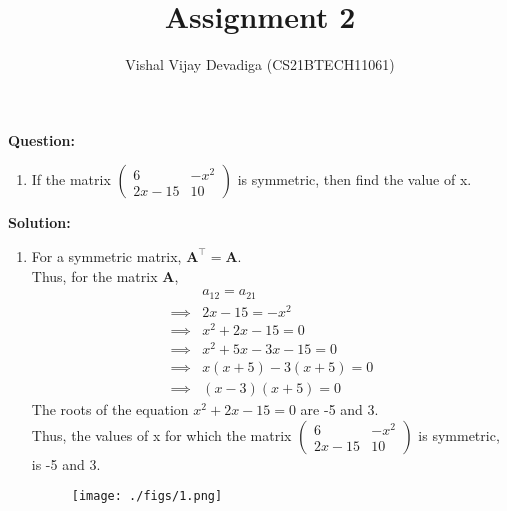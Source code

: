 \documentclass[journal,12pt,twocolumn]{IEEEtran}
\title{Assignment 2}
\author{Vishal Vijay Devadiga (CS21BTECH11061)}
\date{}
\let\vec\mathbf
\newcommand{\myvec}[1]{\ensuremath{\begin{pmatrix}#1\end{pmatrix}}}
\newcommand{\question}{\noindent \textbf{Question: }}
\newcommand{\solution}{\noindent \textbf{Solution: }}
\begin{document}
\maketitle
\question
\begin{enumerate}[label=]
	\item If the matrix $\myvec{6 & -x^2 \\ 2x - 15 & 10}$ is symmetric, then find the value of x.
\end{enumerate}
\solution
\begin{enumerate}[label=]
	\item For a symmetric matrix, $\vec{A}^{\top} = \vec{A}$. \\
	Thus, for the matrix $\vec{A}$,
	\begin{align}
		&a_{12} = a_{21}
		\\
		\implies &2x - 15 = -x^2
		\\
		\implies &x^2 + 2x - 15 = 0
		\\
		\implies &x^2 + 5x - 3x -15 = 0
		\\
		\implies &x(x+5) - 3(x+5) =0
		\\
		\implies &(x-3)(x+5) = 0
	\end{align}
	The roots of the equation $x^2 + 2x -15 = 0$ are -5 and 3. \\
	Thus, the values of x for which the matrix $\myvec{6 & -x^2 \\ 2x - 15 & 10}$ is symmetric, is -5 and 3.
	\begin{figure}[h]
	\centering
	\texttt{[image: ./figs/1.png]}
	\end{figure}
\end{enumerate}
\end{document}
